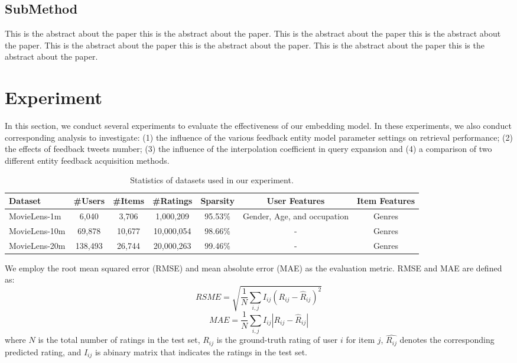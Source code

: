 \documentclass{sig-alternate-05-2015}
\begin{document}
\subsection{SubMethod}
This is the abstract about the paper this is the abstract about the paper.
This is the abstract about the paper this is the abstract about the paper.
This is the abstract about the paper this is the abstract about the paper.
This is the abstract about the paper this is the abstract about the paper.

\section{Experiment}
In this section, we conduct several experiments to evaluate the effectiveness of our embedding model.
In these experiments, we also conduct corresponding analysis to investigate:
(1) the influence of the various feedback entity model parameter settings on
retrieval performance;
(2) the effects of feedback tweets number;
(3) the influence of the interpolation coefficient in query expansion and
(4) a comparison of two different entity feedback acquisition methods.



\begin{table*}[htpb]
	\centering
	\caption{Statistics of datasets used in our experiment.}
	\label{tab:topics}
	\begin{tabular}{|l|c|c|c|c|c|c|}
		\hline
		\textbf{Dataset} & \textbf{\#Users} & \textbf{\#Items} & \textbf{\#Ratings} & \textbf{Sparsity} & \textbf{User Features} & \textbf{Item Features} \\
		\hline
		MovieLens-1m  & 6,040   & 3,706  & 1,000,209  & 95.53\% & Gender, Age, and occupation & Genres \\
		MovieLens-10m & 69,878  & 10,677 & 10,000,054 & 98.66\% & - & Genres \\
		MovieLens-20m & 138,493 & 26,744 & 20,000,263 & 99.46\% & - & Genres \\
		\hline
	\end{tabular}
\end{table*}



We employ the root mean squared error (RMSE) and mean absolute error (MAE) as the evaluation metric.
RMSE and MAE are defined as:
$$ RSME = \sqrt{ \frac{1}{N} \sum_{i,j} I_{ij} (R_{ij} - \hat{R}_{ij})^2 } $$
$$ MAE = \frac{1}{N} \sum_{i,j} I_{ij} |R_{ij} - \hat{R}_{ij}| $$
where $N$ is the total number of ratings in the test set,
$R_{ij}$ is the ground-truth rating of user $i$ for item $j$,
$\hat{R_{ij}}$ denotes the corresponding predicted rating,
and $I_{ij}$ is abinary matrix that indicates the ratings in the test set.
\end{document}

